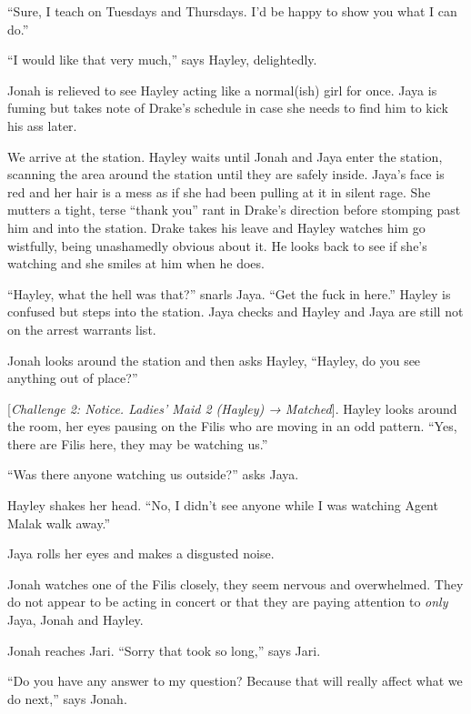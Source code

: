 ``Sure, I teach on Tuesdays and Thursdays. I'd be happy to show you what I can do.''

``I would like that very much,'' says Hayley, delightedly.

Jonah is relieved to see Hayley acting like a normal(ish) girl for once.  Jaya is fuming but takes note of Drake's schedule in case she needs to find him to kick his ass later.





We arrive at the station.  Hayley waits until Jonah and Jaya enter the station, scanning the area around the station until they are safely inside.  Jaya's face is red and her hair is a mess as if she had been pulling at it in silent rage.  She mutters a tight, terse ``thank you'' rant in Drake's direction before stomping past him and into the station. Drake takes his leave and Hayley watches him go wistfully, being unashamedly obvious about it.  He looks back to see if she's watching and she smiles at him when he does.  



``Hayley, what the hell was that?'' snarls Jaya.  ``Get the fuck in here.''  Hayley is confused but steps into the station.  Jaya checks and Hayley and Jaya are still not on the arrest warrants list.



Jonah looks around the station and then asks Hayley, ``Hayley, do you see anything out of place?''

{[}\textit{Challenge 2: Notice.  Ladies' Maid 2 (Hayley) → Matched}{]}.  Hayley looks around the room, her eyes pausing on the Filis who are moving in an odd pattern.  ``Yes, there are Filis here, they may be watching us.''

``Was there anyone watching us outside?'' asks Jaya.

Hayley shakes her head.  ``No, I didn't see anyone while I was watching Agent Malak walk away.''

Jaya rolls her eyes and makes a disgusted noise.

Jonah watches one of the Filis closely, they seem nervous and overwhelmed.  They do not appear to be acting in concert or that they are paying attention to \textit{only} Jaya, Jonah and Hayley.



Jonah reaches Jari.  ``Sorry that took so long,'' says Jari.

``Do you have any answer to my question?  Because that will really affect what we do next,'' says Jonah.  

